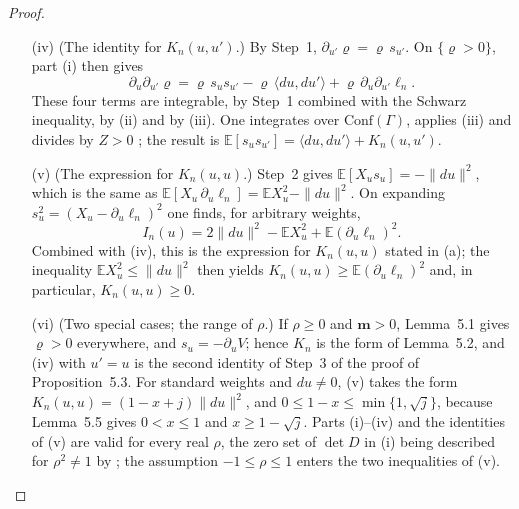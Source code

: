 \documentclass[11pt,letterpaper,reqno]{amsart}
\theoremstyle{definition}
\begin{document}
\begin{proof}
\begin{itemize}
By Step~1 of the proof of Proposition~5.3 and \cite[Definition~2.6]{QEDII}, the integral $\int\mathrm d(A,z)\,(\partial_{u'}\varrho)(A+tu,z)$ does not depend on $t$.
When $|t|\le1$, the derivative in $t$ of the integrand, namely $(\partial_u\partial_{u'}\varrho)(A+tu,z)$, is bounded in modulus by $C\prod_\sigma\exp(-\frac14F_\sigma^2)$ for some constant $C$, and this function is integrable, as in Step~2 of that proof \cite[Lemma~3.14]{QEDII}.
Differentiating at $t=0$, one obtains
\begin{equation*}
\int\mathrm d(A,z)\,\partial_u\partial_{u'}\varrho=0.
\end{equation*}
\item[(iv)] (The identity for $K_n(u,u')$.)
By Step~1, $\partial_{u'}\varrho=\varrho\,s_{u'}$.
On $\{\varrho>0\}$, part (i) then gives
\begin{equation*}
\partial_u\partial_{u'}\varrho=\varrho\,s_us_{u'}-\varrho\,\langle du,du'\rangle+\varrho\,\partial_u\partial_{u'}\ell_n.
\end{equation*}
These four terms are integrable, by Step~1 combined with the Schwarz inequality, by (ii) and by (iii).
One integrates over $\mathrm{Conf}(\Gamma)$, applies (iii) and divides by $Z>0$ \cite[Theorem~4.26]{QEDII}; the result is $\mathbb E[s_us_{u'}]=\langle du,du'\rangle+K_n(u,u')$.
\item[(v)] (The expression for $K_n(u,u)$.)
Step~2 gives $\mathbb E[X_us_u]=-\|du\|^2$, which is the same as $\mathbb E[X_u\,\partial_u\ell_n]=\mathbb EX_u^2-\|du\|^2$.
On expanding $s_u^2=(X_u-\partial_u\ell_n)^2$ one finds, for arbitrary weights,
\begin{equation*}
I_n(u)=2\|du\|^2-\mathbb EX_u^2+\mathbb E(\partial_u\ell_n)^2.
\end{equation*}
Combined with (iv), this is the expression for $K_n(u,u)$ stated in (a); the inequality $\mathbb EX_u^2\le\|du\|^2$ \cite[Theorem~6.27\,(b)]{QEDII} then yields $K_n(u,u)\ge\mathbb E(\partial_u\ell_n)^2$ and, in particular, $K_n(u,u)\ge0$.
\item[(vi)] (Two special cases; the range of $\rho$.)
If $\rho\ge0$ and $\mathbf m>0$, Lemma~5.1 gives $\varrho>0$ everywhere, and $s_u=-\partial_uV$; hence $K_n$ is the form of Lemma~5.2, and (iv) with $u'=u$ is the second identity of Step~3 of the proof of Proposition~5.3.
For standard weights and $du\ne0$, (v) takes the form $K_n(u,u)=(1-x+j)\|du\|^2$, and $0\le1-x\le\min\{1,\sqrt j\}$, because Lemma~5.5 gives $0<x\le1$ and $x\ge1-\sqrt j$.
Parts (i)--(iv) and the identities of (v) are valid for every real $\rho$, the zero set of $\det D$ in (i) being described for $\rho^2\ne1$ by \cite[Theorem~4.13\,(e)]{QEDII}; the assumption $-1\le\rho\le1$ enters the two inequalities of (v).
\end{itemize}


\end{proof}
\end{document}
